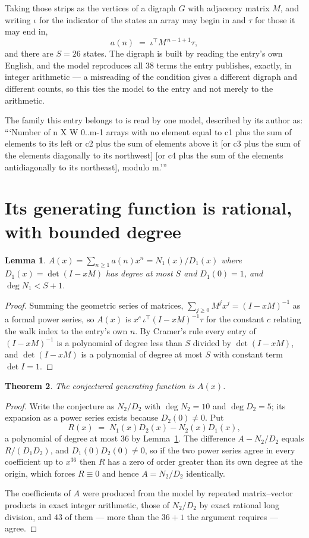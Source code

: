 \documentclass[11pt,a4paper]{article}
\theoremstyle{plain}
\newtheorem{theorem}{Theorem}
\newtheorem{lemma}[theorem]{Lemma}
\theoremstyle{definition}
\begin{document}
Taking those strips as the vertices of a digraph $G$ with adjacency matrix $M$, and writing
$\iota$ for the indicator of the states an array may begin in and $\tau$ for those it may end
in,
\[
a(n)\;=\;\iota^{\!\top}M^{\,n-1+1}\tau ,
\]
and there are $S=26$ states. The digraph is built by reading the entry's own English, and the
model reproduces all $38$ terms the entry publishes, exactly, in integer arithmetic --- a
misreading of the condition gives a different digraph and different counts, so this ties the
model to the entry and not merely to the arithmetic.

The family this entry belongs to is read by one model, described by its author as: ```Number of n X W 0..m-1 arrays with no element equal to c1 plus the sum of elements to its left or c2 plus the sum of elements above it [or c3 plus the sum of the elements diagonally to its northwest] [or c4 plus the sum of the elements antidiagonally to its northeast], modulo m.'''


\section{Its generating function is rational, with bounded degree}

\begin{lemma}\label{lem:rat}
$A(x)=\sum_{n\ge1}a(n)x^n=N_1(x)/D_1(x)$ where $D_1(x)=\det(I-xM)$ has degree at most
$S$ and $D_1(0)=1$, and $\deg N_1<S+1$.
\end{lemma}

\begin{proof}
Summing the geometric series of matrices, $\sum_{j\ge0}M^jx^j=(I-xM)^{-1}$ as a formal
power series, so $A(x)$ is $x^{c}\,\iota^{\!\top}(I-xM)^{-1}\tau$ for the constant $c$
relating the walk index to the entry's own $n$. By Cramer's rule every entry of
$(I-xM)^{-1}$ is a polynomial of degree less than $S$ divided by $\det(I-xM)$, and
$\det(I-xM)$ is a polynomial of degree at most $S$ with constant term $\det I=1$.
\end{proof}

\begin{theorem}
The conjectured generating function is $A(x)$.
\end{theorem}

\begin{proof}
Write the conjecture as $N_2/D_2$ with $\deg N_2=10$ and $\deg D_2=5$; its expansion as a
power series exists because $D_2(0)\neq0$. Put
\[
R(x)\;=\;N_1(x)D_2(x)-N_2(x)D_1(x),
\]
a polynomial of degree at most $36$ by Lemma~\ref{lem:rat}. The difference
$A-N_2/D_2$ equals $R/(D_1D_2)$, and $D_1(0)D_2(0)\neq0$, so if the two power series agree in
every coefficient up to $x^{36}$ then $R$ has a zero of order greater than its own
degree at the origin, which forces $R\equiv0$ and hence $A=N_2/D_2$ identically.

The coefficients of $A$ were produced from the model by repeated matrix--vector products in
exact integer arithmetic, those of $N_2/D_2$ by exact rational long division, and $43$
of them --- more than the $36+1$ the argument requires --- agree.
\end{proof}
\end{document}
